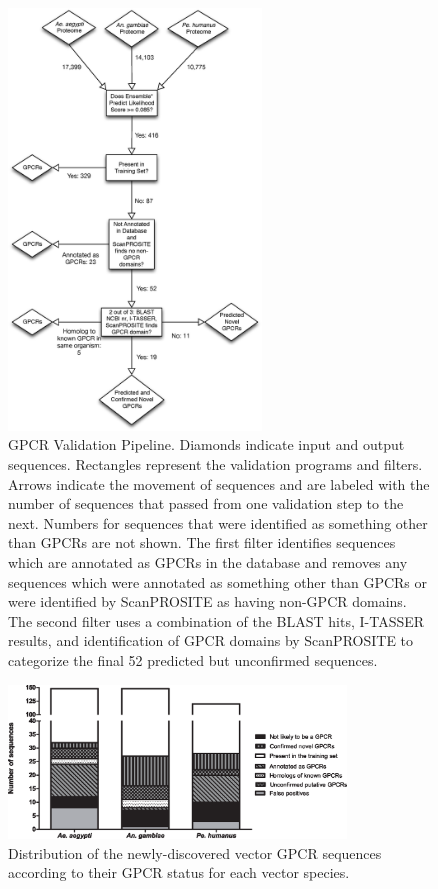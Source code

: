 \begin{figure}[H]
\centering
\includegraphics[width=0.6\textwidth]{figures/gpcr_classifier/validation-pipeline.eps}
\caption{GPCR Validation Pipeline.  Diamonds indicate input and output sequences.  Rectangles represent the validation programs and filters.  Arrows indicate the movement of sequences and are labeled with the number of sequences that passed from one validation step to the next.  Numbers for sequences that were identified as something other than GPCRs are not shown.  The first filter identifies sequences which are annotated as GPCRs in the database and removes any sequences which were annotated as something other than GPCRs or were identified by ScanPROSITE as having non-GPCR domains.  The second filter uses a combination of the BLAST hits, I-TASSER results, and identification of GPCR domains by ScanPROSITE to categorize the final 52 predicted but unconfirmed sequences.}
\label{fig:validation-pipeline}
\end{figure}

\begin{figure}[H]
\centering
\includegraphics[width=0.8\textwidth]{figures/gpcr_classifier/summary-independent-validation.eps}
\caption{Distribution of the newly-discovered vector GPCR sequences according to their GPCR status for each vector species.}
\label{fig:summary-independent-validation}
\end{figure}


